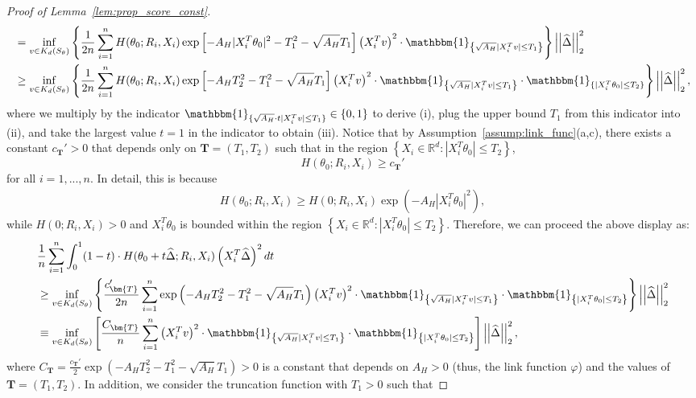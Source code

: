 \documentclass[ejsv2,noshowframe]{imsart}
\theoremstyle{plain}
\theoremstyle{definition}
\theoremstyle{remark}
\newcommand{\norm}[1]{\left|\left| #1 \right|\right|}
\renewcommand{\hat}{\widehat}
\begin{document}
\begin{proof}[Proof of Lemma~\ref{lem:prop_score_const}]
{\begin{align*}
			& =\inf_{v\in K_d(S_{\theta})}\left\{\frac{1}{2n} \sum_{i=1}^n H(\theta_0;R_i,X_i) \exp\left[-A_H|X_i^T\theta_0|^2 -T_1^2 - \sqrt{A_H}T_1 \right]\left(X_i^Tv\right)^2 \cdot \mathbbm{1}_{\left\{\sqrt{A_H} |X_i^T v| \leq T_1\right\}} \right\} \norm{\hat{\Delta}}_2^2\\
			& \geq \inf_{v\in K_d(S_{\theta})}\left\{\frac{1}{2n} \sum_{i=1}^n H(\theta_0;R_i,X_i) \exp\left[-A_HT_2^2 -T_1^2 - \sqrt{A_H}T_1 \right]\left(X_i^Tv\right)^2 \cdot \mathbbm{1}_{\left\{\sqrt{A_H} |X_i^T v| \leq T_1\right\}} \cdot \mathbbm{1}_{\{|X_i^T \theta_0| \leq T_2\}} \right\} \norm{\hat{\Delta}}_2^2,
	\end{align*}}%
	where we multiply by the indicator $\mathbbm{1}_{\{\sqrt{A_H}\cdot t|X_i^T v| \leq T_1\}} \in \{0,1\}$ to derive (i), plug the upper bound $T_1$ from this indicator into (ii), and take the largest value $t=1$ in the indicator to obtain (iii). Notice that by Assumption~\ref{assump:link_func}(a,c), there exists a constant $c_{\bm{T}}'>0$ that depends only on $\bm{T}=(T_1,T_2)$ such that in the region $\left\{X_i\in \mathbb{R}^d:|X_i^T\theta_0| \leq T_2\right\}$,
	$$H(\theta_0;R_i,X_i) \geq c_{\bm{T}}'$$
	for all $i=1,...,n$. In detail, this is because 
	\begin{align*}
		H(\theta_0;R_i,X_i) \geq H(0;R_i,X_i) \exp\left(-A_H |X_i^T\theta_0|^2\right),
	\end{align*}
	while $H(0;R_i,X_i) >0$ and $X_i^T\theta_0$ is bounded within the region $\left\{X_i\in \mathbb{R}^d:|X_i^T\theta_0| \leq T_2\right\}$. Therefore, we can proceed the above display as:
	\begin{align*}
		&\frac{1}{n} \sum_{i=1}^n \int_0^1 (1-t) \cdot H(\theta_0+t\hat{\Delta};R_i,X_i) \left(X_i^T\hat{\Delta}\right)^2 dt \\
		&\geq \inf_{v\in K_d(S_{\theta})}\left\{\frac{c_{\bm{T}}'}{2n} \sum_{i=1}^n \exp\left(-A_HT_2^2 -T_1^2 - \sqrt{A_H}T_1 \right)\left(X_i^Tv\right)^2 \cdot \mathbbm{1}_{\left\{\sqrt{A_H} |X_i^T v| \leq T_1 \right\}} \cdot \mathbbm{1}_{\left\{|X_i^T \theta_0| \leq T_2\right\}} \right\} \norm{\hat{\Delta}}_2^2\\
		&\equiv \inf_{v\in K_d(S_{\theta})}\left[\frac{C_{\bm{T}}}{n} \sum_{i=1}^n \left(X_i^Tv\right)^2 \cdot \mathbbm{1}_{\left\{\sqrt{A_H} |X_i^T v| \leq T_1 \right\}} \cdot \mathbbm{1}_{\left\{|X_i^T \theta_0| \leq T_2\right\}} \right] \norm{\hat{\Delta}}_2^2,
	\end{align*}
	where $C_{\bm{T}} = \frac{c_{\bm{T}}'}{2} \exp\left(-A_HT_2^2 - T_1^2 - \sqrt{A_H} T_1 \right)>0$ is a constant that depends on $A_H>0$ (thus, the link function $\varphi$) and the values of $\bm{T}=(T_1,T_2)$. In addition, we consider the truncation function with $T_1>0$ such that

\end{proof}
\end{document}
